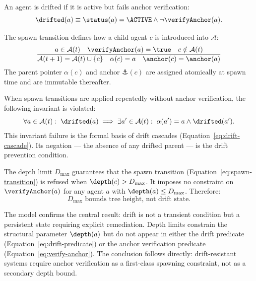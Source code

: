 \begin{definition}
An agent is drifted if it is active but fails anchor verification:
\begin{equation}
\drifted(a) \equiv \status(a) = \ACTIVE \land \neg \verifyAnchor(a).
\label{eq:drift-predicate}
\end{equation}
\end{definition}

\begin{definition}
The spawn transition defines how a child agent $c$ is introduced into $\mathcal{A}$:
\begin{equation}
\frac{a \in \mathcal{A}(t) \quad \verifyAnchor(a) = \true \quad c \notin \mathcal{A}(t)}
     {\mathcal{A}(t+1) = \mathcal{A}(t) \cup \{c\} \quad \alpha(c) = a \quad \anchor(c) = \anchor(a)}
\label{eq:spawn-transition}
\end{equation}
The parent pointer $\alpha(c)$ and anchor $\anchor(c)$ are assigned atomically at spawn time and are immutable thereafter.
\end{definition}

\begin{invariant}
When spawn transitions are applied repeatedly without anchor verification, the following invariant is violated:
\begin{equation}
\forall a \in \mathcal{A}(t):\; \drifted(a) \implies \exists a' \in \mathcal{A}(t):\; \alpha(a') = a \land \drifted(a').
\label{eq:drift-invariant}
\end{equation}
This invariant failure is the formal basis of drift cascades (Equation~\eqref{eq:drift-cascade}). Its negation — the absence of any drifted parent — is the drift prevention condition.
\end{invariant}

\begin{property}
The depth limit $D_{\max}$ guarantees that the spawn transition (Equation~\eqref{eq:spawn-transition}) is refused when $\depth(c) > D_{\max}$. It imposes no constraint on $\verifyAnchor(a)$ for any agent $a$ with $\depth(a) \leq D_{\max}$. Therefore:
\begin{equation}
D_{\max} \text{ bounds tree height, not drift state.}
\end{equation}
\end{property}

The model confirms the central result: drift is not a transient condition but a persistent state requiring explicit remediation. Depth limits constrain the structural parameter $\depth(a)$ but do not appear in either the drift predicate (Equation~\eqref{eq:drift-predicate}) or the anchor verification predicate (Equation~\eqref{eq:verify-anchor}). The conclusion follows directly: drift-resistant systems require anchor verification as a first-class spawning constraint, not as a secondary depth bound.

